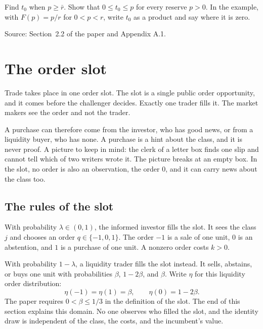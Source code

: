 \begin{checkyourself}
Find \(t_0\) when \(p\ge\bar r\).
Show that \(0\le t_0\le p\) for every reserve \(p>0\).
In the example, with \(F(p)=p/r\) for \(0<p<r\), write \(t_0\) as a product and say where it is zero.
\label{q:model-t0}
\end{checkyourself}

{\small\color{notegrey}Source: Section~2.2 of the paper and Appendix A.1.}

\section{The order slot}\label{sec:model-slot}

Trade takes place in one order slot.
The slot is a single public order opportunity, and it comes before the challenger decides.
Exactly one trader fills it. The market makers see the order and not the trader.

A purchase can therefore come from the investor, who has good news, or from a liquidity buyer, who has none.
A purchase is a hint about the class, and it is never proof.
A picture to keep in mind: the clerk of a letter box finds one slip and cannot tell which of two writers wrote it.
The picture breaks at an empty box. In the slot, no order is also an observation, the order \(0\), and it can carry news about the class too.

\subsection*{The rules of the slot}

With probability \(\lambda\in(0,1)\), the informed investor fills the slot.
It sees the class \(j\) and chooses an order \(q\in\{-1,0,1\}\).
The order \(-1\) is a sale of one unit, \(0\) is an abstention, and \(1\) is a purchase of one unit.
A nonzero order costs \(k>0\).

With probability \(1-\lambda\), a liquidity trader fills the slot instead.
It sells, abstains, or buys one unit with probabilities \(\beta\), \(1-2\beta\), and \(\beta\).
Write \(\eta\) for this liquidity order distribution:
\[
\eta(-1)=\eta(1)=\beta,\qquad \eta(0)=1-2\beta.
\]
The paper requires \(0<\beta\le1/3\) in the definition of the slot. The end of this section explains this domain.
No one observes who filled the slot, and the identity draw is independent of the class, the costs, and the incumbent's value.

